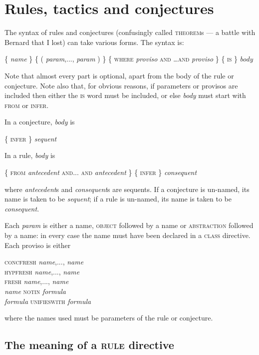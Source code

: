 \section{Rules, tactics and conjectures}
\label{sec:paraformlang:rulestacticsconjectures}

The syntax of rules and conjectures (confusingly called \textsc{theorem}s --- a battle with Bernard that I lost) can take various forms. The syntax is:

\{ \textit{name} \} \{ ( \textit{param},..., \textit{param} ) \} \{ \textsc{where} \textit{proviso} \textsc{and \dots and} \textit{proviso} \} \{ \textsc{is} \} \textit{body}

Note that almost every part is optional, apart from the body of the rule or conjecture. Note also that, for obvious reasons, if parameters or provisos are included then either the \textsc{is} word must be included, or else \textit{body} must start with \textsc{from} or \textsc{infer}.

In a conjecture, \textit{body} is

\{ \textsc{infer \}} \textit{sequent}

In a rule, \textit{body} is

\{ \textsc{from} \textit{antecedent} \textsc{and... and} \textit{antecedent} \} \{ \textsc{infer \}} \textit{consequent}

where \textit{antecedent}s and \textit{consequent}s are sequents. If a conjecture is un-named, its name is taken to be \textit{sequent}; if a rule is un-named, its name is taken to be \textit{consequent}.

Each \textit{param} is either a name, \textsc{object} followed by a name or \textsc{abstraction} followed by a name: in every case the name must have been declared in a \textsc{class} directive. Each proviso is either

\textsc{concfresh} \textit{name},..., \textit{name}\\
\textsc{hypfresh} \textit{name},..., \textit{name}\\
\textsc{fresh} \textit{name},..., \textit{name}\\
\textit{name} \textsc{notin} \textit{formula}\\
\textit{formula} \textsc{unifieswith} \textit{formula}

where the names used must be parameters of the rule or conjecture.

\subsection{The meaning of a \textsc{rule} directive}

